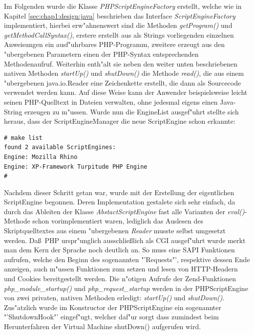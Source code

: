 Im Folgenden wurde die Klasse \emph{PHPScriptEngineFactory} erstellt, welche wie in Kapitel
\ref{sec:chap1:design:java} beschrieben
das Interface \emph{ScriptEngineFactory} implementiert, hierbei erw"ahnenswert sind die Methoden 
\emph{getProgram()} und \emph{getMethodCallSyntax()}, erstere erstellt aus als Strings vorliegenden
einzelnen Anweisungen ein ausf"uhrbares PHP-Programm, zweitere erzeugt aus den "ubergebenen Parametern
einen der PHP-Syntax entsprechenden Methodenaufruf. Weiterhin enth"alt sie neben den weiter unten
beschriebenen nativen Methoden \emph{startUp()} und \emph{shutDown()} die Methode \emph{read()}, die
aus einem "ubergebenen java.io.Reader eine Zeichenkette erstellt, die dann als Sourcecode verwendet
werden kann. Auf diese Weise kann der Anwender beispielsweise leicht seinen PHP-Quelltext in Dateien
verwalten, ohne jedesmal eigens einen Java-String erzeugen zu m"ussen.
Wurde nun die EngineList ausgef"uhrt stellte sich heraus, dass der ScriptEngineManager die neue ScriptEngine schon erkannte:
\begin{lstlisting}[caption=Neue ScriptEngine]
# make list
found 2 available ScriptEngines:
Engine: Mozilla Rhino
Engine: XP-Framework Turpitude PHP Engine
#
\end{lstlisting}

Nachdem dieser Schritt getan war, wurde mit der Erstellung der eigentlichen ScriptEngine begonnen. Deren
Implementation gestalete sich sehr einfach, da durch das Ableiten der Klasse \emph{AbstactScriptEngine} 
fast alle Varianten der \emph{eval()}-Methode schon vorimplementiert waren, lediglich das Auslesen des
Skriptquelltextes aus einem "ubergebenen \emph{Reader} musste selbst umgesetzt werden. 
Da\ss\ PHP urspr"unglich ausschlie\ss lich als CGI ausgef"uhrt wurde merkt man dem Kern der Sprache noch
deutlich an. So muss eine SAPI Funktionen aufrufen, welche den Beginn des sogenannten "'Requests"', respektive
dessen Ende anzeigen, auch m"ussen Funktionen zum setzen und lesen von HTTP-Headern und Cookies bereitgestellt
werden. Die n"otigen Aufrufe der Zend-Funktionen \emph{php\_module\_startup()} und \emph{php\_request\_startup}
werden in der PHPScriptEngine von zwei privaten, nativen Methoden erledigt: \emph{startUp()} und \emph{shutDown()}. 
Zus"atzlich wurde im Konstructor der PHPScriptEngine ein sogenannter "'ShutdownHook"' eingef"ugt, welcher daf"ur 
sorgt dass zumindest beim Herunterfahren der Virtual Machine shutDown() aufgerufen wird.

